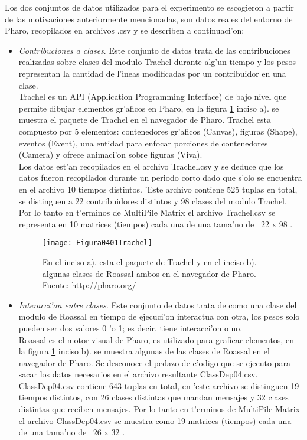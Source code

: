 Los dos conjuntos de datos utilizados para el experimento se escogieron a partir de las motivaciones anteriormente mencionadas, son datos reales del entorno de Pharo, recopilados en archivos .csv y se describen a continuaci'on:
\begin{itemize}
\item \emph{Contribuciones a clases}. Este conjunto de datos trata de las contribuciones realizadas sobre clases del modulo Trachel durante alg'un tiempo y los pesos representan la cantidad de l'ineas modificadas por un contribuidor en una clase. \\
Trachel es un API (Application Programming Interface) de bajo nivel que permite dibujar elementos gr'aficos en Pharo, en la figura \ref{fig:Trachel} inciso a). se muestra el paquete de Trachel en el navegador de Pharo. Trachel esta compuesto por 5 elementos: contenedores gr'aficos (Canvas), figuras (Shape), eventos (Event), una entidad para enfocar porciones de contenedores (Camera) y ofrece animaci'on sobre figuras (Viva). \\
Los datos est'an recopilados en el archivo Trachel.csv y se deduce que los datos fueron recopilados durante un periodo corto dado que s'olo se encuentra en el archivo 10 tiempos distintos. 'Este archivo contiene 525 tuplas en total, se distinguen a 22 contribuidores distintos y 98 clases del modulo Trachel.
Por lo tanto en t'erminos de MultiPile Matrix el archivo Trachel.csv se representa en 10 matrices (tiempos) cada una de una tama'no de \textbar~22 x 98 \textbar.

\begin{figure}[h]
    \centering
    \texttt{[image: Figura0401Trachel]}
    \caption{En el inciso a). esta el paquete de Trachel y en el inciso b). algunas clases de Roassal ambos en el navegador de Pharo. Fuente: \url{http://pharo.org/}}
    \label{fig:Trachel}
\end{figure}

\item \emph{Interacci'on entre clases}. Este conjunto de datos trata de como una clase del modulo de Roassal en tiempo de ejecuci'on interactua con otra, los pesos solo pueden ser dos valores 0 'o 1; es decir, tiene interacci'on o no. \\
Roassal es el motor visual de Pharo, es utilizado para graficar elementos, en la figura \ref{fig:Trachel} inciso b). se muestra algunas de las clases de Roassal en el navegador de Pharo. Se desconoce el pedazo de c'odigo que se ejecuto para sacar los datos necesarios en el archivo resultante ClassDep04.csv. \\
ClassDep04.csv contiene 643 tuplas en total, en 'este archivo se distinguen 19 tiempos distintos, con 26 clases distintas que mandan mensajes y 32 clases distintas que reciben mensajes.
Por lo tanto en t'erminos de MultiPile Matrix el archivo ClassDep04.csv se muestra como 19 matrices (tiempos) cada una de una tama'no de \textbar~26 x 32 \textbar.
\end{itemize}

